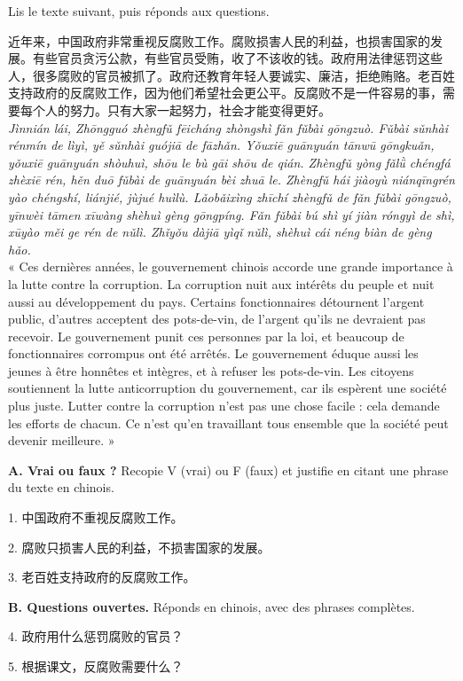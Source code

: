 \documentclass[11pt]{article}
\newcounter{popsec}
\newcounter{popsub}
\newcommand{\courssub}[1]{%
  \stepcounter{popsub}%
  \par\vspace{9pt}\noindent{\popxbold\fontsize{11.5}{13}\selectfont\color{popink}{\color{poporange}\thepopsec.\thepopsub}\hspace{6pt}#1}\par\nopagebreak\vspace{4pt}
}
\begin{document}
\courssub{Je me prépare au Bac}

\begin{exercice}
Lis le texte suivant, puis réponds aux questions.

\begin{textebox}[中国的反腐败斗争]
近年来，中国政府非常重视反腐败工作。腐败损害人民的利益，也损害国家的发展。有些官员贪污公款，有些官员受贿，收了不该收的钱。政府用法律惩罚这些人，很多腐败的官员被抓了。政府还教育年轻人要诚实、廉洁，拒绝贿赂。老百姓支持政府的反腐败工作，因为他们希望社会更公平。反腐败不是一件容易的事，需要每个人的努力。只有大家一起努力，社会才能变得更好。\\
\emph{Jìnnián lái, Zhōngguó zhèngfǔ fēicháng zhòngshì fǎn fǔbài gōngzuò. Fǔbài sǔnhài rénmín de lìyì, yě sǔnhài guójiā de fāzhǎn. Yǒuxiē guānyuán tānwū gōngkuǎn, yǒuxiē guānyuán shòuhuì, shōu le bù gāi shōu de qián. Zhèngfǔ yòng fǎlǜ chéngfá zhèxiē rén, hěn duō fǔbài de guānyuán bèi zhuā le. Zhèngfǔ hái jiàoyù niánqīngrén yào chéngshí, liánjié, jùjué huìlù. Lǎobǎixìng zhīchí zhèngfǔ de fǎn fǔbài gōngzuò, yīnwèi tāmen xīwàng shèhuì gèng gōngpíng. Fǎn fǔbài bú shì yí jiàn róngyì de shì, xūyào měi ge rén de nǔlì. Zhǐyǒu dàjiā yìqǐ nǔlì, shèhuì cái néng biàn de gèng hǎo.}\\
« Ces dernières années, le gouvernement chinois accorde une grande importance à la lutte contre la corruption. La corruption nuit aux intérêts du peuple et nuit aussi au développement du pays. Certains fonctionnaires détournent l'argent public, d'autres acceptent des pots-de-vin, de l'argent qu'ils ne devraient pas recevoir. Le gouvernement punit ces personnes par la loi, et beaucoup de fonctionnaires corrompus ont été arrêtés. Le gouvernement éduque aussi les jeunes à être honnêtes et intègres, et à refuser les pots-de-vin. Les citoyens soutiennent la lutte anticorruption du gouvernement, car ils espèrent une société plus juste. Lutter contre la corruption n'est pas une chose facile : cela demande les efforts de chacun. Ce n'est qu'en travaillant tous ensemble que la société peut devenir meilleure. »
\end{textebox}

\textbf{A. Vrai ou faux ?} Recopie V (vrai) ou F (faux) et justifie en citant une phrase du texte en chinois.

1. 中国政府不重视反腐败工作。

2. 腐败只损害人民的利益，不损害国家的发展。

3. 老百姓支持政府的反腐败工作。

\textbf{B. Questions ouvertes.} Réponds en chinois, avec des phrases complètes.

4. 政府用什么惩罚腐败的官员？

5. 根据课文，反腐败需要什么？
\end{exercice}
\end{document}
